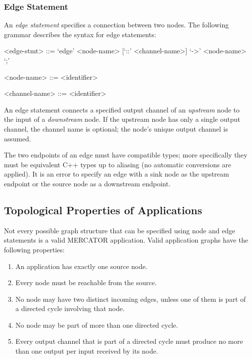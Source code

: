 \documentclass[11pt]{article}
\begin{document}
\subsubsection{Edge Statement}

An \emph{edge statement} specifies a connection between two nodes.
The following grammar describes the syntax for edge statements:
\begin{grammar}

<edge-stmt> ::= `edge' <node-name> [`::' <channel-name>] `->' <node-name> `;'

<node-name> ::= <identifier>

<channel-name> ::= <identifier>

\end{grammar}

An edge statement connects a specified output channel of an
\emph{upstream} node to the input of a \emph{downstream} node. If
the upstream node has only a single output channel, the channel
name is optional; the node's unique output channel is assumed.

The two endpoints of an edge must have compatible types; more
specifically they must be equivalent C++ types up to aliasing (no
automatic conversions are applied).  It is an error to specify an edge
with a sink node as the upstream endpoint or the source node as a
downstream endpoint.

\subsection{Topological Properties of Applications}

Not every possible graph structure that can be specified using node
and edge statements is a valid MERCATOR application. Valid application
graphs have the following properties:

\begin{enumerate}

\item An application has exactly one source node.

\item Every node must be reachable from the source.

\item No node may have two distinct incoming edges, unless one of them
  is part of a directed cycle involving that node.

\item No node may be part of more than one directed cycle.

\item Every output channel that is part of a directed cycle must
  produce no more than one output per input received by its node.

\end{enumerate}
\end{document}
